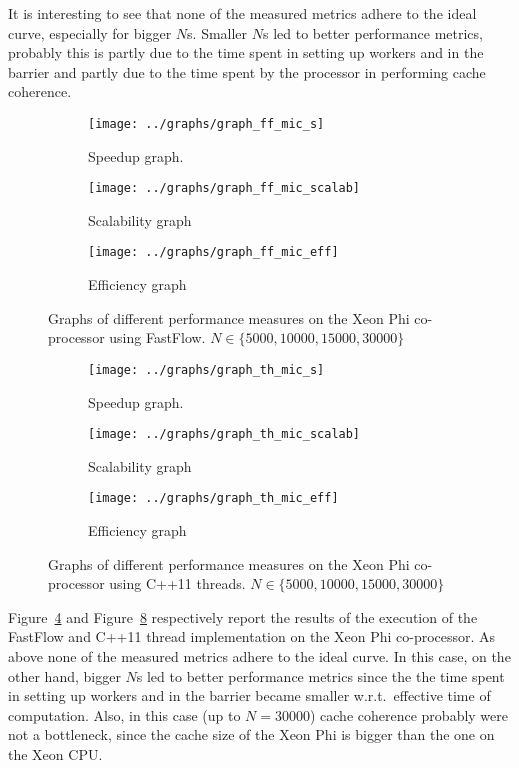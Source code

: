 It is interesting to see that none of the measured metrics adhere to the ideal curve, especially for bigger $N$s.
Smaller $N$s led to better performance metrics, probably this is partly due to the time spent in setting up workers and in the barrier and partly due to the time spent by the processor in performing cache coherence.
\begin{figure}[h]
	\centering
	\begin{subfigure}[b]{0.3\textwidth}
		\texttt{[image: ../graphs/graph\_ff\_mic\_s]}
		\caption{Speedup graph.}
		\label{fig:ff_mic_s}
	\end{subfigure}
	\begin{subfigure}[b]{0.3\textwidth}
		\texttt{[image: ../graphs/graph\_ff\_mic\_scalab]}
		\caption{Scalability graph}
		\label{fig:ff_mic_scalab}
	\end{subfigure}
	\begin{subfigure}[b]{0.3\textwidth}
		\texttt{[image: ../graphs/graph\_ff\_mic\_eff]}
		\caption{Efficiency graph}
		\label{fig:ff_mic_eff}
	\end{subfigure}
	\caption{Graphs of different performance measures  on the Xeon Phi co-processor using FastFlow. $N \in \{ 5000, 10000, 15000, 30000\}$}
	\label{fig:ff_mic}
\end{figure}
\begin{figure}[h]
	\centering
	\begin{subfigure}[b]{0.3\textwidth}
		\texttt{[image: ../graphs/graph\_th\_mic\_s]}
		\caption{Speedup graph.}
		\label{fig:th_mic_s}
	\end{subfigure}
	\begin{subfigure}[b]{0.3\textwidth}
		\texttt{[image: ../graphs/graph\_th\_mic\_scalab]}
		\caption{Scalability graph}
		\label{fig:th_mic_scalab}
	\end{subfigure}
	\begin{subfigure}[b]{0.3\textwidth}
		\texttt{[image: ../graphs/graph\_th\_mic\_eff]}
		\caption{Efficiency graph}
		\label{fig:th_mic_eff}
	\end{subfigure}
	\caption{Graphs of different performance measures  on the Xeon Phi co-processor using C++11 threads. $N \in \{ 5000, 10000, 15000, 30000\}$}
	\label{fig:th_mic}
\end{figure}
Figure~\ref{fig:ff_mic} and Figure~\ref{fig:th_mic} respectively report the results of the execution of the FastFlow and C++11 thread implementation on the Xeon Phi co-processor.
As above none of the measured metrics adhere to the ideal curve.
In this case, on the other hand, bigger $N$s led to better performance metrics since the the time spent in setting up workers and in the barrier became smaller w.r.t.\ effective time of computation.
Also, in this case (up to $N = 30000$) cache coherence probably were not a bottleneck, since the cache size of the Xeon Phi is bigger than the one on the Xeon CPU.

